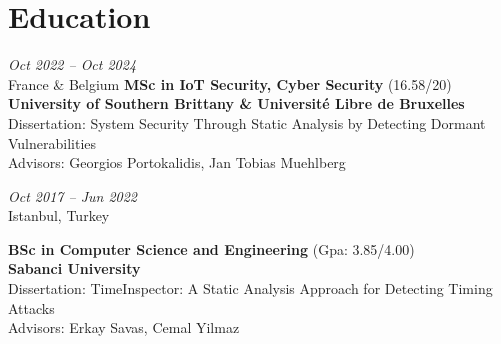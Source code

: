 \section{Education}

\begin{twocolentry}{
    \textit{Oct 2022 – Oct 2024}\\
    \small France \& Belgium}
    \small \textbf{MSc in IoT Security, Cyber Security} \footnotesize(16.58/20)\\
    \normalsize \textbf{University of Southern Brittany \& Université Libre de Bruxelles}\\
    \small Dissertation: System Security Through Static Analysis by Detecting Dormant Vulnerabilities\\
    \small Advisors: Georgios Portokalidis, Jan Tobias Muehlberg
\end{twocolentry}

\vspace{\betweenentryspace}

\begin{twocolentry}{
    \small \textit{Oct 2017 – Jun 2022}\\
    \small Istanbul, Turkey}

    \small \parbox{1.5\linewidth}{\textbf{BSc in Computer Science and Engineering} \footnotesize(Gpa: 3.85/4.00)\\
    \normalsize \textbf{Sabanci University}\\
    \small Dissertation: TimeInspector: A Static Analysis Approach for Detecting Timing Attacks\\
    \small Advisors: Erkay Savas, Cemal Yilmaz}
\end{twocolentry}
